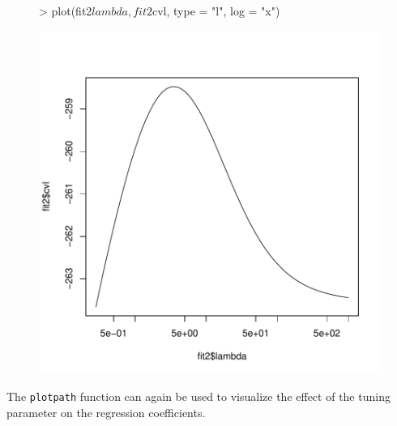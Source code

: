 \documentclass[a4paper]{article}
\newcommand{\Rfunction}[1]{{\texttt{#1}}}
\begin{document}
\begin{figure}
\begin{Schunk}
\begin{Sinput}
> plot(fit2$lambda, fit2$cvl, type = "l", log = "x")
\end{Sinput}
\end{Schunk}
\includegraphics{penalized-profplot2}
\end{figure}

The \Rfunction{plotpath} function can again be used to visualize the effect of the tuning parameter on the regression coefficients.

\begin{Schunk}
\end{Schunk}
\end{document}
